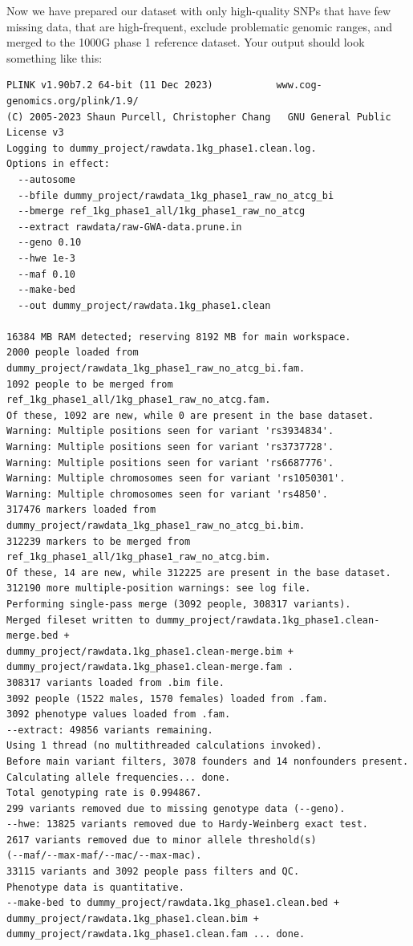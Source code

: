 \documentclass[
]{book}
\begin{document}
Now we have prepared our dataset with only high-quality SNPs that have few missing data, that are high-frequent, exclude problematic genomic ranges, and merged to the 1000G phase 1 reference dataset. Your output should look something like this:

\begin{lstlisting}
PLINK v1.90b7.2 64-bit (11 Dec 2023)           www.cog-genomics.org/plink/1.9/
(C) 2005-2023 Shaun Purcell, Christopher Chang   GNU General Public License v3
Logging to dummy_project/rawdata.1kg_phase1.clean.log.
Options in effect:
  --autosome
  --bfile dummy_project/rawdata_1kg_phase1_raw_no_atcg_bi
  --bmerge ref_1kg_phase1_all/1kg_phase1_raw_no_atcg
  --extract rawdata/raw-GWA-data.prune.in
  --geno 0.10
  --hwe 1e-3
  --maf 0.10
  --make-bed
  --out dummy_project/rawdata.1kg_phase1.clean

16384 MB RAM detected; reserving 8192 MB for main workspace.
2000 people loaded from dummy_project/rawdata_1kg_phase1_raw_no_atcg_bi.fam.
1092 people to be merged from ref_1kg_phase1_all/1kg_phase1_raw_no_atcg.fam.
Of these, 1092 are new, while 0 are present in the base dataset.
Warning: Multiple positions seen for variant 'rs3934834'.
Warning: Multiple positions seen for variant 'rs3737728'.
Warning: Multiple positions seen for variant 'rs6687776'.
Warning: Multiple chromosomes seen for variant 'rs1050301'.
Warning: Multiple chromosomes seen for variant 'rs4850'.
317476 markers loaded from dummy_project/rawdata_1kg_phase1_raw_no_atcg_bi.bim.
312239 markers to be merged from ref_1kg_phase1_all/1kg_phase1_raw_no_atcg.bim.
Of these, 14 are new, while 312225 are present in the base dataset.
312190 more multiple-position warnings: see log file.
Performing single-pass merge (3092 people, 308317 variants).
Merged fileset written to dummy_project/rawdata.1kg_phase1.clean-merge.bed +
dummy_project/rawdata.1kg_phase1.clean-merge.bim +
dummy_project/rawdata.1kg_phase1.clean-merge.fam .
308317 variants loaded from .bim file.
3092 people (1522 males, 1570 females) loaded from .fam.
3092 phenotype values loaded from .fam.
--extract: 49856 variants remaining.
Using 1 thread (no multithreaded calculations invoked).
Before main variant filters, 3078 founders and 14 nonfounders present.
Calculating allele frequencies... done.
Total genotyping rate is 0.994867.
299 variants removed due to missing genotype data (--geno).
--hwe: 13825 variants removed due to Hardy-Weinberg exact test.
2617 variants removed due to minor allele threshold(s)
(--maf/--max-maf/--mac/--max-mac).
33115 variants and 3092 people pass filters and QC.
Phenotype data is quantitative.
--make-bed to dummy_project/rawdata.1kg_phase1.clean.bed +
dummy_project/rawdata.1kg_phase1.clean.bim +
dummy_project/rawdata.1kg_phase1.clean.fam ... done.
\end{lstlisting}
\end{document}

